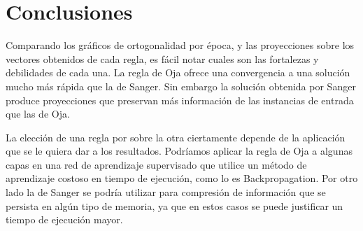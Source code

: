 \documentclass[a4paper,10pt]{article}
\begin{document}
\section{Conclusiones}

Comparando los gráficos de ortogonalidad por época, y las proyecciones sobre
los vectores obtenidos de cada regla, es fácil notar cuales son las fortalezas
y debilidades de cada una. La regla de Oja ofrece una convergencia a una
solución mucho más rápida que la de Sanger. Sin embargo la solución obtenida
por Sanger produce proyecciones que preservan más información de las
instancias de entrada que las de Oja.

La elección de una regla por sobre la otra ciertamente depende de la
aplicación que se le quiera dar a los resultados. Podríamos aplicar la regla
de Oja a algunas capas en una red de aprendizaje supervisado que utilice un
método de aprendizaje costoso en tiempo de ejecución, como lo es
Backpropagation. Por otro lado la de Sanger se podría utilizar para compresión
de información que se persista en algún tipo de memoria, ya que en estos casos
se puede justificar un tiempo de ejecución mayor.
\end{document}
